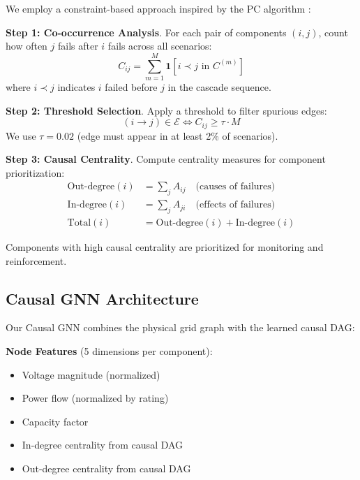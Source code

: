 \documentclass[journal,12pt,onecolumn]{IEEEtran}
\begin{document}
We employ a constraint-based approach inspired by the PC algorithm \cite{ref16}:

\textbf{Step 1: Co-occurrence Analysis}. For each pair of components $(i, j)$, count how often $j$ fails after $i$ fails across all scenarios:
\begin{equation}
C_{ij} = \sum_{m=1}^{M} \mathbf{1}[i \prec j \text{ in } C^{(m)}]
\label{eq:cooccurrence}
\end{equation}
where $i \prec j$ indicates $i$ failed before $j$ in the cascade sequence.

\textbf{Step 2: Threshold Selection}. Apply a threshold to filter spurious edges:
\begin{equation}
(i \rightarrow j) \in \mathcal{E} \iff C_{ij} \geq \tau \cdot M
\label{eq:threshold}
\end{equation}
We use $\tau = 0.02$ (edge must appear in at least 2\% of scenarios).

\textbf{Step 3: Causal Centrality}. Compute centrality measures for component prioritization:
\begin{align}
\text{Out-degree}(i) &= \sum_{j} A_{ij} \quad \text{(causes of failures)} \\
\text{In-degree}(i) &= \sum_{j} A_{ji} \quad \text{(effects of failures)} \\
\text{Total}(i) &= \text{Out-degree}(i) + \text{In-degree}(i)
\end{align}

Components with high causal centrality are prioritized for monitoring and reinforcement.

\subsection{Causal GNN Architecture}

Our Causal GNN combines the physical grid graph with the learned causal DAG:

\textbf{Node Features} (5 dimensions per component):
\begin{itemize}
    \item Voltage magnitude (normalized)
    \item Power flow (normalized by rating)
    \item Capacity factor
    \item In-degree centrality from causal DAG
    \item Out-degree centrality from causal DAG
\end{itemize}
\end{document}
